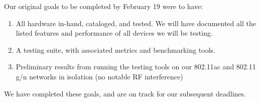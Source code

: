 

Our original goals to be completed by February 19 were to have:

\begin{enumerate}
\item All hardware in-hand, cataloged, and tested. We will have documented all the listed features and performance of all devices we will be testing.
\item A testing suite, with associated metrics and benchmarking tools.
\item Preliminary results from running the testing tools on our 802.11ac and 802.11 g/n networks in isolation (no notable RF interference)
\end{enumerate}

We have completed these goals, and are on track for our subsequent deadlines.
